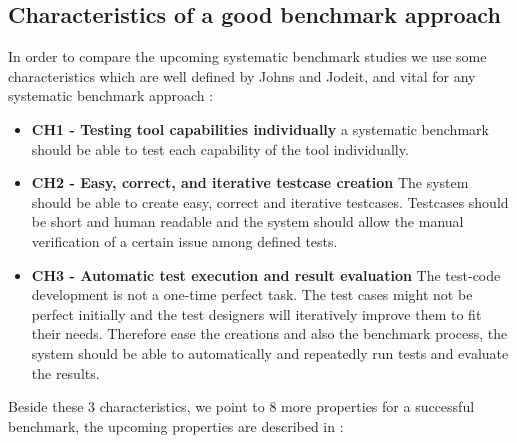 \documentclass[authoryear,preprint]{sigplanconf}
\begin{document}
\subsection{Characteristics of a good benchmark approach}
\label{sec:good_benchmark}

In order to compare the upcoming systematic benchmark studies we use some characteristics which are well defined by Johns and Jodeit, and vital for any systematic benchmark approach \cite{Scanstud}:

\begin{itemize}
	\item \textbf{CH1 - Testing tool capabilities individually} a systematic benchmark should be able to test each capability of the tool individually. 
	\item \textbf{CH2 - Easy, correct, and iterative testcase creation} The system should be able to create easy, correct and iterative testcases. Testcases should be short and human readable and the system should allow the manual verification of a certain issue among defined tests. 
	\item \textbf{CH3 - Automatic test execution and result evaluation} The test-code development is not a one-time perfect task. The test cases might not be perfect initially and the test designers will iteratively improve them to fit their needs. Therefore ease the creations and also the benchmark process, the system should be able to automatically and repeatedly run tests and evaluate the results. 
\end{itemize}

Beside these 3 characteristics, we point to 8 more properties for a successful benchmark, the upcoming properties are described in \cite{sim2003}:
\end{document}
